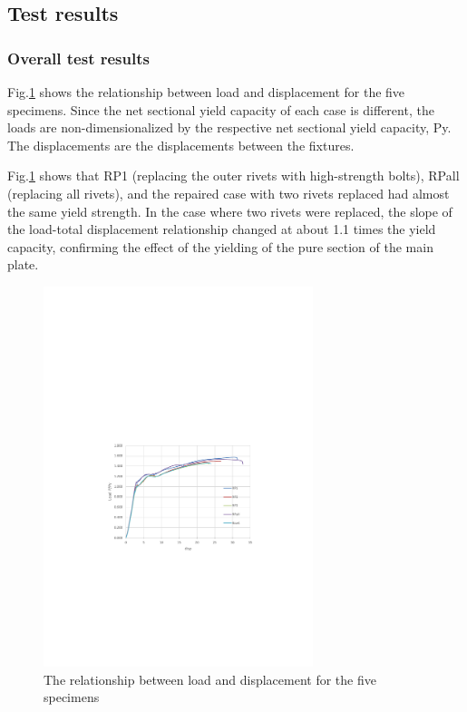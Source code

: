 \subsection{Test results}

\subsubsection{Overall test results}

Fig.\ref{fig-3-10} shows the relationship between load and displacement for the five specimens. Since the net sectional yield capacity of each case is different, the loads are non-dimensionalized by the respective net sectional yield capacity, Py. The displacements are the displacements between the fixtures.

Fig.\ref{fig-3-10} shows that RP1 (replacing the outer rivets with high-strength bolts), RPall (replacing all rivets), and the repaired case with two rivets replaced had almost the same yield strength. In the case where two rivets were replaced, the slope of the load-total displacement relationship changed at about 1.1 times the yield capacity, confirming the effect of the yielding of the pure section of the main plate.

\begin{figure}[htbp]
    \centering
    \includegraphics[width=0.7\textwidth]{imgs/ch3/fig3-10.pdf}
    \caption{The relationship between load and displacement for the five specimens}
    \label{fig-3-10}
\end{figure}

